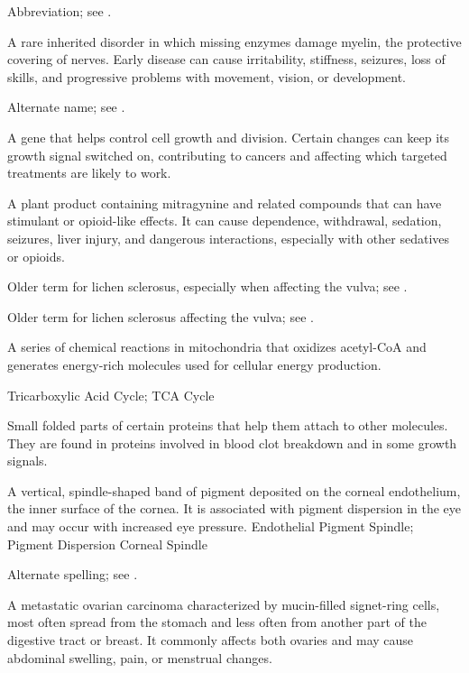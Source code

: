  Abbreviation; see .

 A rare inherited disorder in which missing enzymes damage myelin, the protective covering of nerves. Early disease can cause irritability, stiffness, seizures, loss of skills, and progressive problems with movement, vision, or development.

 Alternate name; see .

 A gene that helps control cell growth and division. Certain changes can keep its growth signal switched on, contributing to cancers and affecting which targeted treatments are likely to work.

 A plant product containing mitragynine and related compounds that can have stimulant or opioid-like effects. It can cause dependence, withdrawal, sedation, seizures, liver injury, and dangerous interactions, especially with other sedatives or opioids.

 Older term for lichen sclerosus, especially when affecting the vulva; see .

 Older term for lichen sclerosus affecting the vulva; see .

 A series of chemical reactions in mitochondria that oxidizes acetyl-CoA and generates energy-rich molecules used for cellular energy production.

\synonyms
Tricarboxylic Acid Cycle; TCA Cycle

 Small folded parts of certain proteins that help them attach to other molecules. They are found in proteins involved in blood clot breakdown and in some growth signals.

 A vertical, spindle-shaped band of pigment deposited on the corneal endothelium, the inner surface of the cornea. It is associated with pigment dispersion in the eye and may occur with increased eye pressure.
\synonyms
Endothelial Pigment Spindle; Pigment Dispersion Corneal Spindle

 Alternate spelling; see .

 A metastatic ovarian carcinoma characterized by mucin-filled signet-ring cells, most often spread from the stomach and less often from another part of the digestive tract or breast. It commonly affects both ovaries and may cause abdominal swelling, pain, or menstrual changes.


